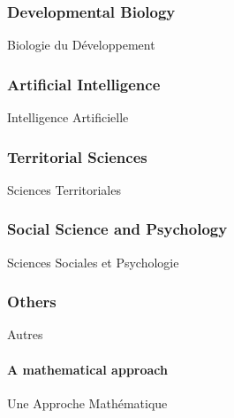 \subsubsection*{Developmental Biology}{Biologie du Développement}


\subsubsection*{Artificial Intelligence}{Intelligence Artificielle}



\subsubsection*{Territorial Sciences}{Sciences Territoriales}


\subsubsection*{Social Science and Psychology}{Sciences Sociales et Psychologie}


\subsubsection*{Others}{Autres}


\paragraph{A mathematical approach}{Une Approche Mathématique}


